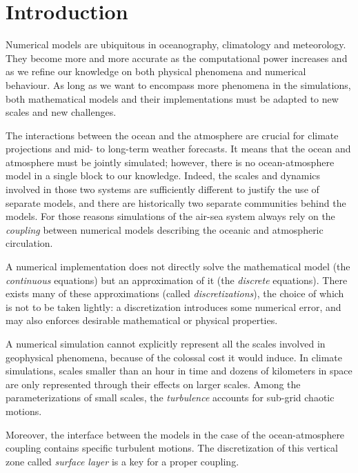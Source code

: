 \chapter*{Introduction}
\label{ch:introduction}
Numerical models are ubiquitous in oceanography, climatology and
meteorology. They become more and more accurate as the
computational power increases and as we refine our knowledge on
both physical phenomena and numerical behaviour.
As long as we want to encompass more phenomena in the simulations,
both mathematical models and their implementations must be
adapted to new scales and new challenges.
\par %
The interactions between the ocean and the atmosphere are crucial
for climate projections and mid- to long-term weather forecasts.
It means that the ocean and atmosphere must be jointly simulated;
however, there is no ocean-atmosphere model in a single
block to our knowledge.
Indeed, the scales and dynamics involved in those two systems are
sufficiently different to justify the use of separate models,
and there are historically two separate communities behind the
models. For those reasons simulations of the air-sea system
always rely on the \textit{coupling} between numerical models describing
the oceanic and atmospheric circulation.
\par %
A numerical implementation does not directly solve the mathematical
model (the \textit{continuous} equations) but an approximation of it
(the \textit{discrete} equations). There exists many of these
approximations (called \textit{discretizations}), the choice of which
is not to be taken lightly: a discretization introduces some
numerical error, and may also enforces desirable mathematical
or physical properties.
\par
A numerical simulation cannot explicitly represent all the
scales involved in geophysical phenomena, because of the
colossal cost it would induce. In climate simulations,
scales smaller than an hour in time
and dozens of kilometers in space are only represented
through their effects on larger scales.
Among the parameterizations of small scales, the \textit{turbulence}
accounts for sub-grid chaotic motions.
\par %
Moreover, the interface between the models in the case of
the ocean-atmosphere coupling contains
specific turbulent motions. The discretization of this vertical zone
called \textit{surface layer} is a key for a proper coupling.
